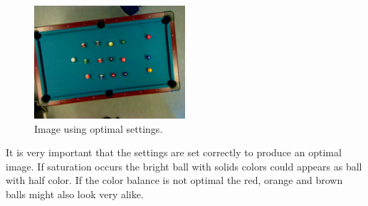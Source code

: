 \begin{figure}[H]
\begin{center}
\leavevmode
\includegraphics[width=0.5\textwidth]{images/good-from-program}
\end{center}
\caption{Image using optimal settings.}
\label{fig:bestimgcamera}
\end{figure} 

It is very important that the settings are set correctly to produce an optimal image. If saturation occurs the bright ball with solids colors could appears as ball with half color. If the color balance is not optimal the red, orange and brown balls might also look very alike.\\

